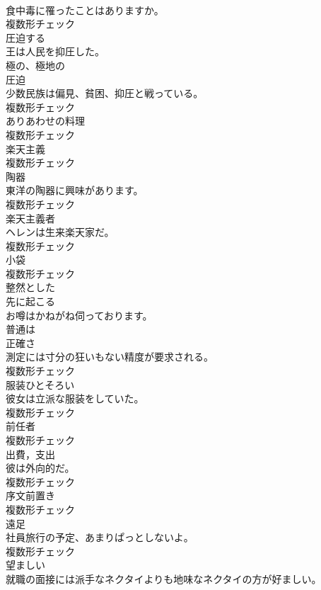 \documentclass[8pt]{extreport}
\begin{document}
\begin{CJK}{UTF8}{min}
\\	食中毒に罹ったことはありますか。	
\\	複数形チェック
\\	[動詞]	圧迫する	
\\	王は人民を抑圧した。	
\\	[形容詞]	極の、極地の	
\\	[名詞]	圧迫	
\\	少数民族は偏見、貧困、抑圧と戦っている。	
\\	複数形チェック
\\	[名詞]	ありあわせの料理	
\\	複数形チェック
\\	[名詞]	楽天主義	
\\	複数形チェック
\\	[名詞]	陶器	
\\	東洋の陶器に興味があります。	
\\	複数形チェック
\\	[名詞]	楽天主義者	
\\	ヘレンは生来楽天家だ。	
\\	複数形チェック
\\	[名詞]	小袋	
\\	複数形チェック
\\	[形容詞]	整然とした	
\\	[動詞]	先に起こる	
\\	お噂はかねがね伺っております。	
\\	[副詞]	普通は	
\\	[名詞]	正確さ	
\\	測定には寸分の狂いもない精度が要求される。	
\\	複数形チェック
\\	[名詞]	服装ひとそろい	
\\	彼女は立派な服装をしていた。	
\\	複数形チェック
\\	[名詞]	前任者	
\\	複数形チェック
\\	[名詞]	出費，支出	
\\	彼は外向的だ。	
\\	複数形チェック
\\	[名詞]	序文前置き	
\\	複数形チェック
\\	[名詞]	遠足	
\\	社員旅行の予定、あまりぱっとしないよ。	
\\	複数形チェック
\\	[形容詞]	望ましい	
\\	就職の面接には派手なネクタイよりも地味なネクタイの方が好ましい。	

\end{CJK}
\end{document}

